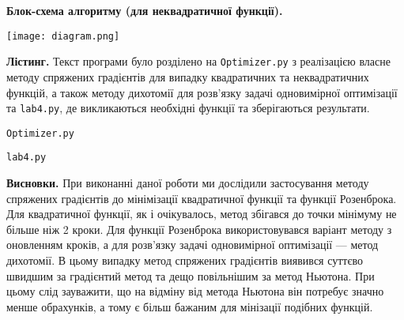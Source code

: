 \documentclass{extreport}
\begin{document}
\noindent\textbf{Блок-схема алгоритму (для неквадратичної функції).}\\
\begin{center}
    \texttt{[image: diagram.png]}
\end{center}

\noindent\textbf{Лістинг.}
Текст програми було розділено на \texttt{Optimizer.py} з реалізацією
власне методу спряжених градієнтів для випадку квадратичних та неквадратичних функцій,
а також методу дихотомії для розв'язку задачі одновимірної оптимізації
та \texttt{lab4.py}, де викликаються необхідні функції та зберігаються результати.

\noindent\texttt{Optimizer.py}


\noindent\texttt{lab4.py}


\noindent\textbf{Висновки.} При виконанні даної роботи ми дослідили
застосування методу спряжених градієнтів до мінімізації квадратичної функції та функції Розенброка.
Для квадратичної функції, як і очікувалось, метод збігався до точки мінімуму не більше ніж 2 кроки.
Для функції Розенброка використовувався варіант методу з оновленням кроків, а для розв'язку задачі
одновимірної оптимізації --- метод дихотомії. В цьому випадку метод спряжених градієнтів виявився
суттєво швидшим за градієнтий метод та дещо повільнішим за метод Ньютона. При цьому слід зауважити, що
на відміну від метода Ньютона він потребує значно менше обрахунків, а тому є більш бажаним для мінізації подібних функцій.
\end{document}
